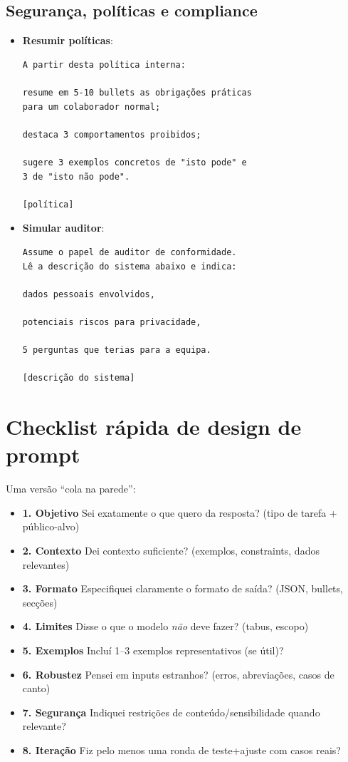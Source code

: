 \subsection*{Segurança, políticas e compliance}

\begin{itemize}[leftmargin=*]
\item \textbf{Resumir políticas}:
\begin{lstlisting}
A partir desta política interna:

resume em 5-10 bullets as obrigações práticas
para um colaborador normal;

destaca 3 comportamentos proibidos;

sugere 3 exemplos concretos de "isto pode" e
3 de "isto não pode".

[política]
\end{lstlisting}
\item \textbf{Simular auditor}:
\begin{lstlisting}
Assume o papel de auditor de conformidade.
Lê a descrição do sistema abaixo e indica:

dados pessoais envolvidos,

potenciais riscos para privacidade,

5 perguntas que terias para a equipa.

[descrição do sistema]
\end{lstlisting}
\end{itemize}

\section{Checklist rápida de design de prompt}

Uma versão “cola na parede”:

\begin{itemize}[leftmargin=*]
\item \textbf{1. Objetivo}
Sei exatamente o que quero da resposta? (tipo de tarefa + público-alvo)
\item \textbf{2. Contexto}
Dei contexto suficiente? (exemplos, constraints, dados relevantes)
\item \textbf{3. Formato}
Especifiquei claramente o formato de saída? (JSON, bullets, secções)
\item \textbf{4. Limites}
Disse o que o modelo \emph{não} deve fazer? (tabus, escopo)
\item \textbf{5. Exemplos}
Incluí 1–3 exemplos representativos (se útil)?
\item \textbf{6. Robustez}
Pensei em inputs estranhos? (erros, abreviações, casos de canto)
\item \textbf{7. Segurança}
Indiquei restrições de conteúdo/sensibilidade quando relevante?
\item \textbf{8. Iteração}
Fiz pelo menos uma ronda de teste+ajuste com casos reais?
\end{itemize}

